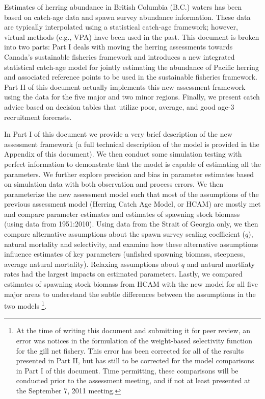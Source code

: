 Estimates of herring abundance in British Columbia (B.C.) waters  has been based on catch-age data and spawn survey abundance information.  These data are typically interpolated using a statistical catch-age framework; however, virtual methods (e.g., VPA) have been used in the past.  This document is broken into two parts: Part I deals with moving the herring assessments towards Canada's sustainable fisheries framework and introduces a new integrated statistical catch-age model for jointly estimating the abundance of Pacific herring and associated reference points to be used in the sustainable fisheries framework.  Part II of this document actually implements this new assessment framework using the data for the five major and two minor regions.  Finally, we present catch advice based on decision tables that utilize poor, average, and good age-3 recruitment forecasts.

In Part I of this document we provide a very brief description of the new assessment framework (a full technical description of the model is provided in the Appendix of this document).  We then conduct some simulation testing with perfect information to  demonstrate that the model is capable of estimating all the parameters. We further explore precision and bias in parameter estimates based on simulation data with both observation and process errors.  We then parameterize the new assessment model such that most of the assumptions of the previous assessment model (Herring Catch Age Model, or HCAM) are mostly met and compare parameter estimates and estimates of spawning stock biomass (using data from 1951:2010).  Using data from the Strait of Georgia only, we then compare alternative assumptions about the spawn survey scaling coefficient ($q$), natural mortality and selectivity, and examine how these alternative assumptions influence estimates of key parameters (unfished spawning biomass, steepness, average natural mortality).  Relaxing assumptions about $q$ and natural mortliaty rates had the largest impacts on estimated parameters.  Lastly, we compared estimates of spawning stock biomass from HCAM with the new model for all five major areas to understand the subtle differences between the assumptions in the two models \footnote{At the time of writing this document and submitting it for peer review, an error was notices in the formulation of the weight-based selectivity function for the gill net fishery.  This error has been corrected for all of the results presented in Part II, but has still to be corrected for the model comparisons in Part I of this document.  Time permitting, these comparisons will be conducted prior to the assessment meeting, and if not at least presented at the September 7, 2011 meeting.}.

